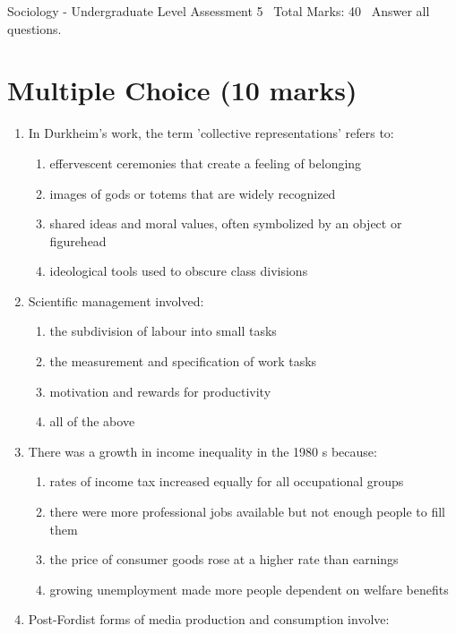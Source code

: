\documentclass[12pt]{article}
\begin{document}
\begin{center}
Sociology - Undergraduate Level Assessment 5 \
Total Marks: 40 \
Answer all questions.
\end{center}

\section*{Multiple Choice (10 marks)}
\begin{enumerate}[label=\arabic*.]
\item In Durkheim's work, the term 'collective representations' refers to:
\begin{enumerate}[label=(\alph*)]
    \item effervescent ceremonies that create a feeling of belonging
    \item images of gods or totems that are widely recognized
    \item shared ideas and moral values, often symbolized by an object or figurehead
    \item ideological tools used to obscure class divisions
\end{enumerate}
\item Scientific management involved:
\begin{enumerate}[label=(\alph*)]
    \item the subdivision of labour into small tasks
    \item the measurement and specification of work tasks
    \item motivation and rewards for productivity
    \item all of the above
\end{enumerate}
\item There was a growth in income inequality in the 1980 s because:
\begin{enumerate}[label=(\alph*)]
    \item rates of income tax increased equally for all occupational groups
    \item there were more professional jobs available but not enough people to fill them
    \item the price of consumer goods rose at a higher rate than earnings
    \item growing unemployment made more people dependent on welfare benefits
\end{enumerate}
\item Post-Fordist forms of media production and consumption involve:
\begin{enumerate}[label=(\alph*)]

\end{enumerate}
\end{enumerate}
\end{document}
